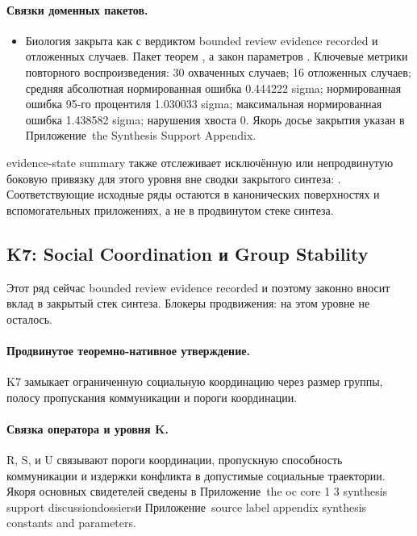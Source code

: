 \paragraph{Связки доменных пакетов.}
\begin{itemize}[leftmargin=1.6em,nosep]
\item Биология закрыта как  с вердиктом bounded review evidence recorded и  отложенных случаев. Пакет теорем , а закон параметров . Ключевые метрики повторного воспроизведения: 30 охваченных случаев; 16 отложенных случаев; средняя абсолютная нормированная ошибка 0.444222 sigma; нормированная ошибка 95-го процентиля 1.030033 sigma; максимальная нормированная ошибка 1.438582 sigma; нарушения хвоста 0. Якорь досье закрытия указан в Приложение~the Synthesis Support Appendix.
\end{itemize}
evidence-state summary также отслеживает  исключённую или непродвинутую боковую привязку для этого уровня вне сводки закрытого синтеза: . Соответствующие исходные ряды остаются в канонических поверхностях и вспомогательных приложениях, а не в продвинутом стеке синтеза.

\subsection{K7: Social Coordination и Group Stability}
\label{sec:oc-core-1-3-synthesis-k7}
Этот ряд сейчас bounded review evidence recorded и поэтому законно вносит вклад в закрытый стек синтеза.
Блокеры продвижения: на этом уровне не осталось.

\paragraph{Продвинутое теоремно-нативное утверждение.}
K7 замыкает ограниченную социальную координацию через размер группы, полосу пропускания коммуникации и пороги координации.

\paragraph{Связка оператора и уровня K.}
R, S, и U связывают пороги координации, пропускную способность коммуникации и издержки конфликта в допустимые социальные траектории.
Якоря основных свидетелей сведены в Приложение~the oc core 1 3 synthesis support discussiondossiersи Приложение~source label appendix synthesis constants and parameters.

